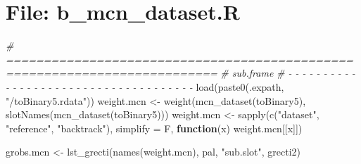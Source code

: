 \documentclass[
]{article}
\newenvironment{Shaded}{\begin{snugshade}}{\end{snugshade}}
\newcommand{\AttributeTok}[1]{\textcolor[rgb]{0.77,0.63,0.00}{#1}}
\newcommand{\CommentTok}[1]{\textcolor[rgb]{0.56,0.35,0.01}{\textit{#1}}}
\newcommand{\ControlFlowTok}[1]{\textcolor[rgb]{0.13,0.29,0.53}{\textbf{#1}}}
\newcommand{\FunctionTok}[1]{\textcolor[rgb]{0.00,0.00,0.00}{#1}}
\newcommand{\NormalTok}[1]{#1}
\newcommand{\OtherTok}[1]{\textcolor[rgb]{0.56,0.35,0.01}{#1}}
\newcommand{\StringTok}[1]{\textcolor[rgb]{0.31,0.60,0.02}{#1}}
\begin{document}
\hypertarget{file-b_mcn_dataset.r-1}{%
\section{File: b\_mcn\_dataset.R}\label{file-b_mcn_dataset.r-1}}

\begin{Shaded}
\begin{Highlighting}[]
\CommentTok{\# ==========================================================================}
\CommentTok{\# sub.frame}
\CommentTok{\# {-} {-} {-} {-} {-} {-} {-} {-} {-} {-} {-} {-} {-} {-} {-} {-} {-} {-} {-} {-} {-} {-} {-} {-} {-} {-} {-} {-} {-} {-} {-} {-} {-} {-} {-} {-} {-}}
\FunctionTok{load}\NormalTok{(}\FunctionTok{paste0}\NormalTok{(.expath, }\StringTok{"/toBinary5.rdata"}\NormalTok{))}
\NormalTok{weight.mcn }\OtherTok{\textless{}{-}} \FunctionTok{weight}\NormalTok{(}\FunctionTok{mcn\_dataset}\NormalTok{(toBinary5), }\FunctionTok{slotNames}\NormalTok{(}\FunctionTok{mcn\_dataset}\NormalTok{(toBinary5)))}
\NormalTok{weight.mcn }\OtherTok{\textless{}{-}} 
  \FunctionTok{sapply}\NormalTok{(}\FunctionTok{c}\NormalTok{(}\StringTok{"dataset"}\NormalTok{, }\StringTok{"reference"}\NormalTok{, }\StringTok{"backtrack"}\NormalTok{), }\AttributeTok{simplify =}\NormalTok{ F,}
         \ControlFlowTok{function}\NormalTok{(x) weight.mcn[[x]])}

\NormalTok{grobs.mcn }\OtherTok{\textless{}{-}} \FunctionTok{lst\_grecti}\NormalTok{(}\FunctionTok{names}\NormalTok{(weight.mcn), pal, }\StringTok{"sub.slot"}\NormalTok{, grecti2)}
\end{Highlighting}
\end{Shaded}
\end{document}
